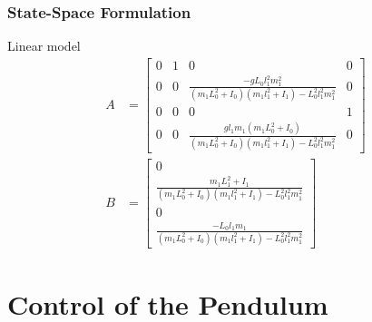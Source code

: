 \documentclass[]{beamer}
\begin{document}
\begin{frame}
	\frametitle{State-Space Formulation}
	Linear model
	\begin{subequations}
		\begin{align*}
		A &=\begin{bmatrix}0&1&0&0\\
		0&0&\frac{-gL_0l_1^2m_1^2}{(m_1L_0^2+I_0)(m_1l_1^2+I_1)-L_0^2l_1^2m_1^2}&0\\
		0&0&0&1\\
		0&0&\frac{gl_1m_1(m_1L_0^2+I_0)}{(m_1L_0^2+I_0)(m_1l_1^2+I_1)-L_0^2l_1^2m_1^2}&0
		\end{bmatrix}\\
		B &=	\begin{bmatrix}
		0\\ 
		\frac{m_1L_1^2+I_1}{(m_1L_0^2+I_0)(m_1l_1^2+I_1)-L_0^2l_1^2m_1^2}\\
		0\\
		\frac{-L_0l_1m_1}{(m_1L_0^2+I_0)(m_1l_1^2+I_1)-L_0^2l_1^2m_1^2}
		\end{bmatrix}
		\end{align*}
	\end{subequations}
\end{frame}

\section{Control of the Pendulum}
\end{document}
